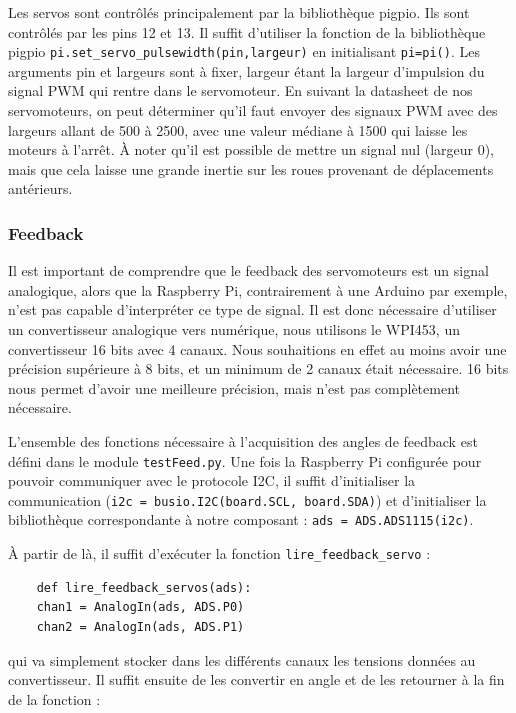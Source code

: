 \documentclass[a4paper,12pt]{report}  %
\begin{document}
Les servos sont contrôlés principalement par la bibliothèque pigpio.  
Ils sont contrôlés par les pins 12 et 13. Il suffit d’utiliser la fonction de la bibliothèque pigpio \texttt{pi.set\_servo\_pulsewidth(pin,largeur)} en initialisant \texttt{pi=pi()}. Les arguments pin et largeurs sont à fixer, largeur étant la largeur d’impulsion du signal PWM qui rentre dans le servomoteur. En suivant la datasheet de nos servomoteurs, on peut déterminer qu’il faut envoyer des signaux PWM avec des largeurs allant de 500 à 2500, avec une valeur médiane à 1500 qui laisse les moteurs à l’arrêt.
À noter qu’il est possible de mettre un signal nul (largeur 0), mais que cela laisse une grande inertie sur les roues provenant de déplacements antérieurs. 

\subsubsection{Feedback}

Il est important de comprendre que le feedback des servomoteurs est un signal analogique, alors que la Raspberry Pi, contrairement à une Arduino par exemple, n’est pas capable d’interpréter ce type de signal. Il est donc nécessaire d’utiliser un convertisseur analogique vers numérique, nous utilisons le WPI453, un convertisseur 16 bits avec 4 canaux. Nous souhaitions en effet au moins avoir une précision supérieure à 8 bits, et un minimum de 2 canaux était nécessaire. 16 bits nous permet d’avoir une meilleure précision, mais n’est pas complètement nécessaire.

L’ensemble des fonctions nécessaire à l’acquisition des angles de feedback est défini dans le module \texttt{testFeed.py}. Une fois la Raspberry Pi configurée pour pouvoir communiquer avec le protocole I2C, il suffit d’initialiser la communication (\texttt{i2c = busio.I2C(board.SCL, board.SDA)}) et d’initialiser la bibliothèque correspondante à notre composant : \texttt{ads = ADS.ADS1115(i2c)}.

À partir de là, il suffit d’exécuter la fonction \texttt{lire\_feedback\_servo} : 

\begin{lstlisting}
	def lire_feedback_servos(ads):
	chan1 = AnalogIn(ads, ADS.P0)
	chan2 = AnalogIn(ads, ADS.P1)
\end{lstlisting}

qui va simplement stocker dans les différents canaux les tensions données au convertisseur. Il suffit ensuite de les convertir en angle et de les retourner à la fin de la fonction :
\end{document}
